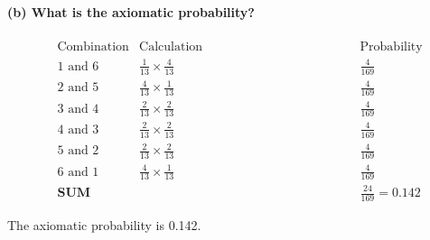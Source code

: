\textbf{\newpage\noindent(b) What is the axiomatic probability?\\\\}
\begin{align*}
    &\text{Combination} &\text{Calculation}\hspace{100pt}  &\text{Probability}\\
    &\text{1 and 6 }&\frac{1}{13}\times \frac{4}{13}\hspace{100pt} &\frac{4}{169}\\
    &\text{2 and 5 }&\frac{4}{13}\times \frac{1}{13}\hspace{100pt} &\frac{4}{169}\\
    &\text{3 and 4 }&\frac{2}{13}\times \frac{2}{13}\hspace{100pt} &\frac{4}{169}\\
    &\text{4 and 3 }&\frac{2}{13}\times \frac{2}{13}\hspace{100pt} &\frac{4}{169}\\
    &\text{5 and 2 }&\frac{2}{13}\times \frac{2}{13}\hspace{100pt} &\frac{4}{169}\\
    &\text{6 and 1 }&\frac{4}{13}\times \frac{1}{13}\hspace{100pt} &\frac{4}{169}\\
    &\textbf{SUM} & \hspace{200pt} &\frac{24}{169} = 0.142 
\end{align*}

\noindent The axiomatic probability is 0.142.